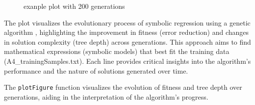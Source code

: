 \documentclass[
  letterpaper,
  DIV=11,
  numbers=noendperiod]{scrartcl}
\begin{document}
\begin{figure}


\caption{\label{fig-plot}exanple plot with 200 generations}

\end{figure}%

The plot visualizes the evolutionary process of symbolic regression
using a genetic algorithm , highlighting the improvement in fitness
(error reduction) and changes in solution complexity (tree depth) across
generations. This approach aims to find mathematical expressions
(symbolic models) that best fit the training data
(A4\_trainingSamples.txt). Each line provides critical insights into the
algorithm's performance and the nature of solutions generated over time.

The \texttt{plotFigure} function visualizes the evolution of fitness and
tree depth over generations, aiding in the interpretation of the
algorithm's progress.
\end{document}
